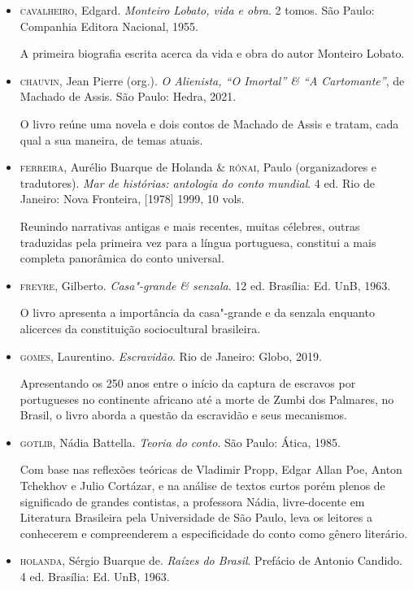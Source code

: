\documentclass[11pt]{extarticle}
\begin{document}
\begin{itemize}
\item  \textsc{cavalheiro}, Edgard. \emph{Monteiro Lobato, vida e obra}. 2 tomos. São
Paulo: Companhia Editora Nacional, 1955.

A primeira biografia escrita acerca da vida e obra do autor Monteiro Lobato.

\item  \textsc{chauvin}, Jean Pierre (org.). \emph{O Alienista, ``O Imortal'' \& ``A
Cartomante''}, de Machado de Assis. São Paulo: Hedra, 2021.

O livro reúne uma novela e dois contos de Machado de Assis e tratam, cada qual 
a sua maneira, de temas atuais.

\item  \textsc{ferreira}, Aurélio Buarque de Holanda \& \textsc{rónai}, Paulo (organizadores e
tradutores). \emph{Mar de histórias: antologia do conto mundial}. 4 ed.
Rio de Janeiro: Nova Fronteira, {[}1978{]} 1999, 10 vols. 

Reunindo narrativas antigas e mais recentes, muitas célebres, outras traduzidas
pela primeira vez para a língua portuguesa, constitui a mais completa
panorâmica do conto universal.

\item \textsc{freyre}, Gilberto. \emph{Casa"-grande \& senzala}. 12 ed. Brasília: Ed.
UnB, 1963.

O livro apresenta a importância da casa"-grande e da senzala enquanto alicerces da 
constituição sociocultural brasileira. 

\item \textsc{gomes}, Laurentino. \emph{Escravidão}. Rio de Janeiro: Globo, 2019.

Apresentando os 250 anos entre o início da captura de escravos por portugueses no 
continente africano até a morte de Zumbi dos Palmares, no Brasil, o livro aborda
a questão da escravidão e seus mecanismos.

\item \textsc{gotlib}, Nádia Battella. \emph{Teoria do conto}. São Paulo: Ática, 1985.

Com base nas reflexões teóricas de Vladimir Propp, Edgar Allan Poe,
Anton Tchekhov e Julio Cortázar, e na análise de textos curtos porém
plenos de significado de grandes contistas, a professora Nádia,
livre-docente em Literatura Brasileira pela Universidade de São Paulo,
leva os leitores a conhecerem e compreenderem a especificidade do conto
como gênero literário.

\item \textsc{holanda}, Sérgio Buarque de. \emph{Raízes do Brasil}. Prefácio de Antonio
Candido. 4 ed. Brasília: Ed. UnB, 1963.


\end{itemize}
\end{document}
